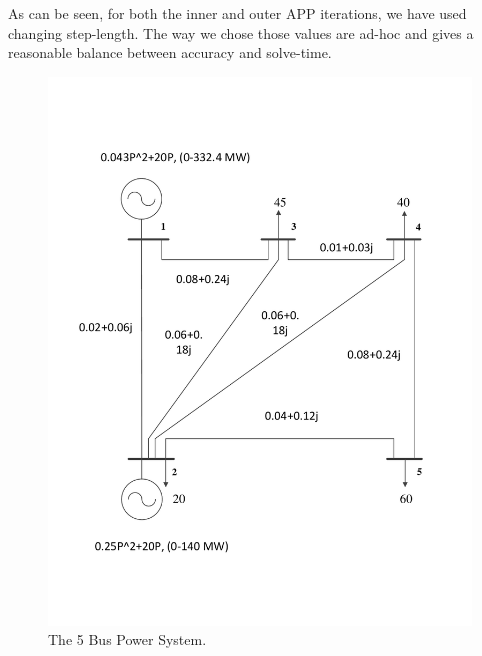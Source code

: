 \documentclass[preprint,12pt,3p]{elsarticle}
\begin{document}
As can be seen, for both the inner and outer APP iterations, we have used changing step-length. The way we chose those values are ad-hoc and gives a reasonable balance between accuracy and solve-time.
\iffalse
\begin{figure}
\begin{center}
\includegraphics[width=0.92\linewidth,trim=5mm 12mm 5mm 5mm, clip]{5_bus}
\caption{The 5 Bus Power System.}
\label{fig:5Bus}
\end{center}
\end{figure}
\end{document}
